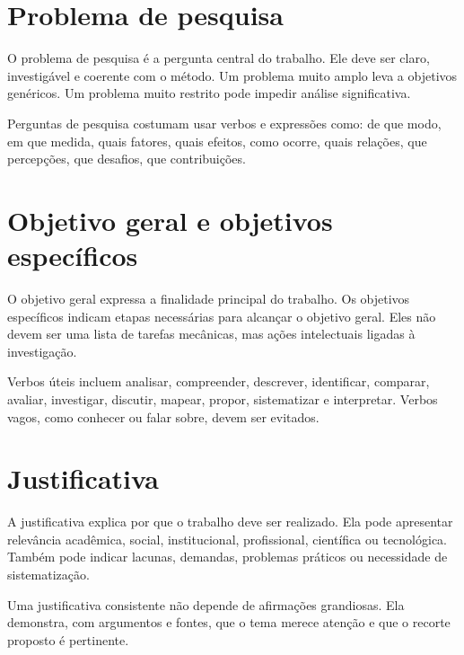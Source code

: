 \section{Problema de pesquisa}

O problema de pesquisa é a pergunta central do trabalho. Ele deve ser claro, investigável e coerente com o método. Um problema muito amplo leva a objetivos genéricos. Um problema muito restrito pode impedir análise significativa.

Perguntas de pesquisa costumam usar verbos e expressões como: de que modo, em que medida, quais fatores, quais efeitos, como ocorre, quais relações, que percepções, que desafios, que contribuições.


\section{Objetivo geral e objetivos específicos}

O objetivo geral expressa a finalidade principal do trabalho. Os objetivos específicos indicam etapas necessárias para alcançar o objetivo geral. Eles não devem ser uma lista de tarefas mecânicas, mas ações intelectuais ligadas à investigação.

Verbos úteis incluem analisar, compreender, descrever, identificar, comparar, avaliar, investigar, discutir, mapear, propor, sistematizar e interpretar. Verbos vagos, como conhecer ou falar sobre, devem ser evitados.

\section{Justificativa}

A justificativa explica por que o trabalho deve ser realizado. Ela pode apresentar relevância acadêmica, social, institucional, profissional, científica ou tecnológica. Também pode indicar lacunas, demandas, problemas práticos ou necessidade de sistematização.

Uma justificativa consistente não depende de afirmações grandiosas. Ela demonstra, com argumentos e fontes, que o tema merece atenção e que o recorte proposto é pertinente.

